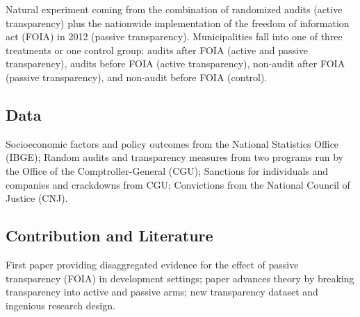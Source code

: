 \documentclass[]{article}
\begin{document}
Natural experiment coming from the combination of randomized audits
(active transparency) plus the nationwide implementation of the freedom
of information act (FOIA) in 2012 (passive transparency). Municipalities
fall into one of three treatments or one control group: audits after
FOIA (active and passive transparency), audits before FOIA (active
transparency), non-audit after FOIA (passive transparency), and
non-audit before FOIA (control).

\hypertarget{data-2}{%
\subsection{Data}\label{data-2}}

Socioeconomic factors and policy outcomes from the National Statistics
Office (IBGE); Random audits and transparency measures from two programs
run by the Office of the Comptroller-General (CGU); Sanctions for
individuals and companies and crackdowns from CGU; Convictions from the
National Council of Justice (CNJ).

\hypertarget{contribution-and-literature-2}{%
\subsection{Contribution and
Literature}\label{contribution-and-literature-2}}

First paper providing disaggregated evidence for the effect of passive
transparency (FOIA) in development settings; paper advances theory by
breaking transparency into active and passive arms; new transparency
dataset and ingenious research design.
\end{document}
